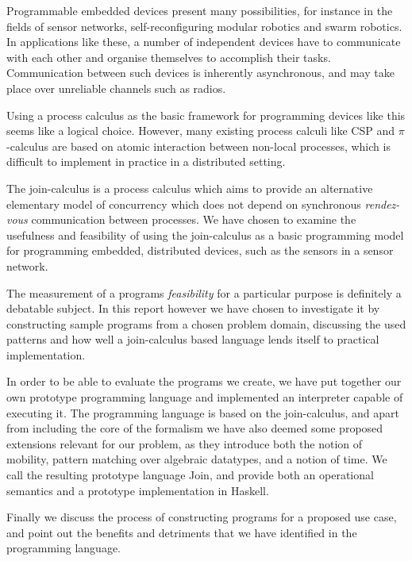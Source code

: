 
Programmable embedded devices present many possibilities, for instance in the
fields of sensor networks, self-reconfiguring modular robotics and swarm
robotics. In applications like these, a number of independent devices have to
communicate with each other and organise themselves to accomplish their tasks.
Communication between such devices is inherently asynchronous, and may take
place over unreliable channels such as radios.

Using a process calculus as the basic framework for programming devices like
this seems like a logical choice. However, many existing process calculi like
CSP\cite{hoare-csp} and $\pi$-calculus\cite{milner-pi} are based on atomic
interaction between non-local processes, which is difficult to implement in
practice in a distributed setting.

The join-calculus\cite{fournet1996reflexive} is a process calculus which aims to
provide an alternative elementary model of concurrency which does not depend on
synchronous \emph{rendez-vous} communication between processes. We have chosen
to examine the usefulness and feasibility of using the join-calculus as a
basic programming model for programming embedded, distributed devices, such as
the sensors in a sensor network.

The measurement of a programs \emph{feasibility} for a particular purpose is
definitely a debatable subject. In this report however we have chosen to
investigate it by constructing sample programs from a chosen problem domain,
discussing the used patterns and how well a join-calculus based language lends
itself to practical implementation.

In order to be able to evaluate the programs we create, we have put together our
own prototype programming language and implemented an interpreter capable of
executing it. The programming language is based on the join-calculus, and apart
from including the core of the formalism we have also deemed some proposed
extensions relevant for our problem, as they introduce both the notion of
mobility, pattern matching over algebraic datatypes, and a notion of time. We
call the resulting prototype language Join, and provide both an operational
semantics and a prototype implementation in Haskell.

Finally we discuss the process of constructing programs for a proposed use case,
and point out the benefits and detriments that we have identified in the
programming language.
